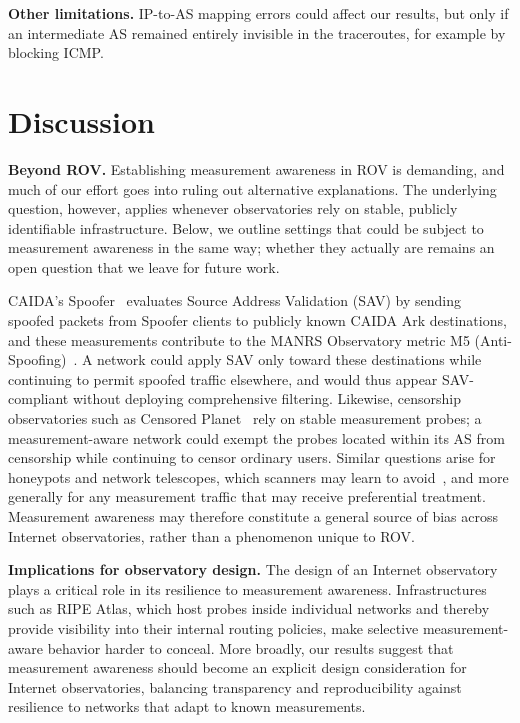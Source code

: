 \documentclass[sigconf, 10pt]{acmart}
\begin{document}
\noindent\textbf{Other limitations.} IP-to-AS mapping errors could affect our results, but only if an intermediate AS remained entirely invisible in the traceroutes, for example by blocking ICMP.

\section{Discussion}

\noindent\textbf{Beyond ROV.} Establishing measurement awareness in ROV is demanding, and much of our effort goes into ruling out alternative explanations. The underlying question, however, applies whenever observatories rely on stable, publicly identifiable infrastructure. Below, we outline settings that could be subject to measurement awareness in the same way; whether they actually are remains an open question that we leave for future work. 

CAIDA's Spoofer~\cite{spoofer} evaluates Source Address Validation (SAV) by sending spoofed packets from Spoofer clients to publicly known CAIDA Ark destinations, and these measurements contribute to the MANRS Observatory metric M5 (Anti-Spoofing)~\cite{manrsmetric}. A network could apply SAV only toward these destinations while continuing to permit spoofed traffic elsewhere, and would thus appear SAV-compliant without deploying comprehensive filtering. Likewise, censorship observatories such as Censored Planet~\cite{censoredplanet} rely on stable measurement probes; a measurement-aware network could exempt the probes located within its AS from censorship while continuing to censor ordinary users. Similar questions arise for honeypots and network telescopes, which scanners may learn to avoid~\cite{lightscope}, and more generally for any measurement traffic that may receive preferential treatment. Measurement awareness may therefore constitute a general source of bias across Internet observatories, rather than a phenomenon unique to ROV.


\noindent\textbf{Implications for observatory design.}
The design of an Internet observatory plays a critical role in its resilience to measurement awareness. Infrastructures such as RIPE Atlas, which host probes inside individual networks and thereby provide visibility into their internal routing policies, make selective measurement-aware behavior harder to conceal. More broadly, our results suggest that measurement awareness should become an explicit design consideration for Internet observatories, balancing transparency and reproducibility against resilience to networks that adapt to known measurements.
\end{document}
